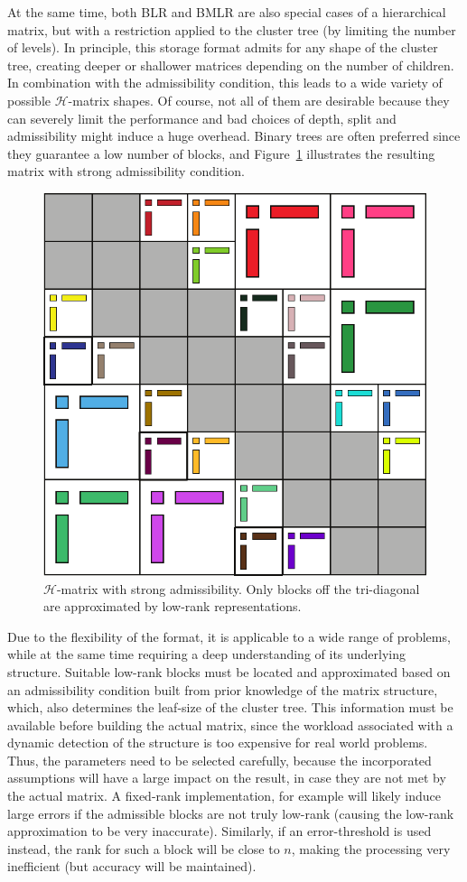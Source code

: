 At the same time, both BLR and BMLR are also special cases of a hierarchical matrix, but with a restriction applied to the cluster tree (by limiting the number of levels). In principle, this storage format admits for any shape of the cluster tree, creating deeper or shallower matrices depending on the number of children. In combination with the admissibility condition, this leads to a wide variety of possible $\mathcal{H}$-matrix shapes. Of course, not all of them are desirable because they can severely limit the performance and bad choices of depth, split and admissibility might induce a huge overhead. Binary trees are often preferred since they guarantee a low number of blocks, and Figure~\hyperref[fig:h_matrix]{\ref{fig:h_matrix}} illustrates the resulting matrix with strong admissibility condition.

\begin{figure}[h]
    \centering
    \includegraphics[width=0.6\linewidth]{chapters/4_hierarchical_matrices/figures/H_matrix.pdf}
    \caption[\texorpdfstring{$\mathcal{H}$}{H}-matrix]{$\mathcal{H}$-matrix with strong admissibility. Only blocks off the tri-diagonal are approximated by low-rank representations.}
    \label{fig:h_matrix}
\end{figure}

Due to the flexibility of the format, it is applicable to a wide range of problems, while at the same time requiring a deep understanding of its underlying structure. Suitable low-rank blocks must be located and approximated based on an admissibility condition built from prior knowledge of the matrix structure, which, also determines the leaf-size of the cluster tree. This information must be available before building the actual matrix, since the workload associated with a dynamic detection of the structure is too expensive for real world problems. Thus, the parameters need to be selected carefully, because the incorporated assumptions will have a large impact on the result, in case they are not met by the actual matrix. A fixed-rank implementation, for example will likely induce large errors if the admissible blocks are not truly low-rank (causing the low-rank approximation to be very inaccurate). Similarly, if an error-threshold is used instead, the rank for such a block will be close to $n$, making the processing very inefficient (but accuracy will be maintained).   

